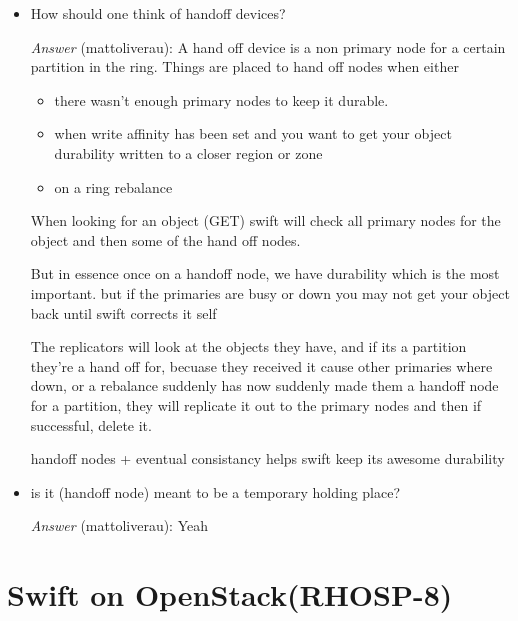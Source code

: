\documentclass{article}
\begin{document}
\begin{itemize}
\item How should one think of handoff devices?

\emph{Answer} (mattoliverau): A hand off device is a non primary node
for a certain partition in the ring. Things are placed to hand
off nodes when either

\begin{itemize}
\item there wasn't enough primary nodes to keep it durable.
\item when write affinity has been set and you want to get your
object durability written to a closer region or zone
\item on a ring rebalance
\end{itemize}
When looking for an object (GET) swift will check all primary
nodes for the object and then some of the hand off nodes.

But in essence once on a handoff node, we have durability which
is the most important. but if the primaries are busy or down you
may not get your object back until swift corrects it self

The replicators will look at the objects they have, and if its a
partition they're a hand off for, becuase they received it cause
other primaries where down, or a rebalance suddenly has now
suddenly made them a handoff node for a partition, they will
replicate it out to the primary nodes and then if successful,
delete it.

handoff nodes + eventual consistancy helps swift keep its awesome
durability
\end{itemize}


\begin{itemize}
\item is it (handoff node) meant to be a temporary holding place?

\emph{Answer} (mattoliverau): Yeah
\end{itemize}

\section{Swift on OpenStack(RHOSP-8)}
\label{sec:org266f440}
\end{document}
